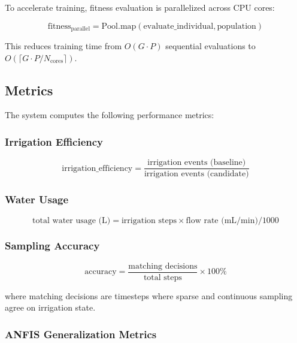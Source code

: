 To accelerate training, fitness evaluation is parallelized across CPU cores:

\begin{equation}
\text{fitness}_{\text{parallel}} = \text{Pool.map}(\text{evaluate\_individual}, \text{population})
\end{equation}

This reduces training time from $O(G \cdot P)$ sequential evaluations to $O(\lceil G \cdot P / N_{\text{cores}} \rceil)$.

\subsection{Metrics}

The system computes the following performance metrics:

\subsubsection{Irrigation Efficiency}

\begin{equation}
\text{irrigation\_efficiency} = \frac{\text{irrigation events (baseline)}}{\text{irrigation events (candidate)}}
\end{equation}

\subsubsection{Water Usage}

\begin{equation}
\text{total water usage (L)} = \text{irrigation steps} \times \text{flow rate (mL/min)} / 1000
\end{equation}

\subsubsection{Sampling Accuracy}

\begin{equation}
\text{accuracy} = \frac{\text{matching decisions}}{\text{total steps}} \times 100\%
\end{equation}

where matching decisions are timesteps where sparse and continuous sampling agree on irrigation state.

\subsubsection{ANFIS Generalization Metrics}

